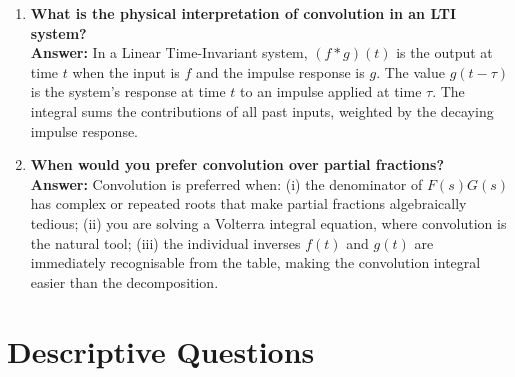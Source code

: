 \documentclass[12pt,a4paper]{article}
\begin{document}
\begin{enumerate}[label=\textbf{Q\arabic*.}, leftmargin=*, itemsep=6pt]
\item \textbf{What is the physical interpretation of convolution in an LTI system?} \\
\textbf{Answer:} In a Linear Time-Invariant system, $(f*g)(t)$ is the output
at time $t$ when the input is $f$ and the impulse response is $g$. The value
$g(t-\tau)$ is the system's response at time $t$ to an impulse applied at
time $\tau$. The integral sums the contributions of all past inputs, weighted
by the decaying impulse response.

\item \textbf{When would you prefer convolution over partial fractions?} \\
\textbf{Answer:} Convolution is preferred when: (i) the denominator of $F(s)G(s)$
has complex or repeated roots that make partial fractions algebraically
tedious; (ii) you are solving a Volterra integral equation, where convolution
is the natural tool; (iii) the individual inverses $f(t)$ and $g(t)$ are
immediately recognisable from the table, making the convolution integral
easier than the decomposition.

\end{enumerate}

\section{Descriptive Questions}
\end{document}
